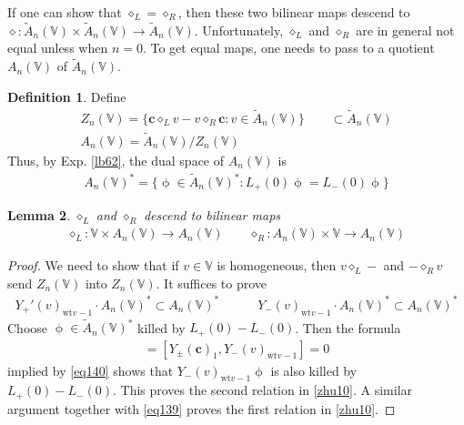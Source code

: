 \documentclass[11pt,b5paper,notitlepage]{article}
\theoremstyle{definition}
\newtheorem{df}{Definition}[subsection]
\theoremstyle{plain}
\newtheorem{lm}[df]{Lemma}
\newcommand{\wtd}{\widetilde}
\newcommand{\Vbb}{\mathbb V}
\newcommand{\cbf}{\mathbf c}
\newcommand{\wt}{\mathrm{wt}}
\newcommand{\<}{\left\langle}
\renewcommand{\>}{\right\rangle}
\numberwithin{equation}{subsection}
\begin{document}
If one can show that $\diamond_L=\diamond_R$, then these two bilinear maps descend to $\diamond:\wtd A_n(\Vbb)\times\wtd A_n(\Vbb)\rightarrow\wtd A_n(\Vbb)$. Unfortunately, $\diamond_L$ and $\diamond_R$ are in general not equal unless when $n=0$. To get equal maps, one needs to pass to a quotient $A_n(\Vbb)$ of $\wtd A_n(\Vbb)$.


\begin{df}
Define
\begin{subequations}\label{eq152}
\begin{gather}
Z_n(\Vbb)=\big\{\cbf\diamond_L v-v\diamond_R\cbf:v\in \wtd A_n(\Vbb)\big\}\qquad\subset \wtd A_n(\Vbb)\\[0.5ex]
A_n(\Vbb)=\wtd A_n(\Vbb)/Z_n(\Vbb)
\end{gather}
\end{subequations}
Thus, by Exp. \ref{lb62}, the dual space of $A_n(\Vbb)$ is
\begin{align}
A_n(\Vbb)^*=\big\{\upphi\in \wtd A_n(\Vbb)^*: L_+(0)\upphi= L_-(0)\upphi  \big\} \label{eq146}
\end{align}
\end{df}


\begin{lm}\label{zhu11}
$\diamond_L$ and $\diamond_R$ descend to bilinear maps
\begin{align}
\diamond_L:\Vbb\times A_n(\Vbb)\rightarrow A_n(\Vbb)\qquad \diamond_R: A_n(\Vbb)\times\Vbb\rightarrow A_n(\Vbb)   \label{eq143}
\end{align}
\end{lm}

     \begin{proof}
We need to show that if $v\in\Vbb$ is homogeneous, then $v\diamond_L-$ and $-\diamond_R v$ send $Z_n(\Vbb)$ into $Z_n(\Vbb)$. It suffices to prove
         \begin{align}\label{zhu10}
             Y_+'(v)_{\wt v-1}\cdot A_n(\Vbb)^*\subset A_n(\Vbb)^*\qquad\quad Y_-(v)_{\wt v-1}\cdot A_n(\Vbb)^*\subset A_n(\Vbb)^*
         \end{align}
Choose $\upphi\in\wtd A_n(\Vbb)^*$  killed by $L_+(0)-L_-(0)$. Then the formula
\begin{align*}
[L_\pm(0),Y_-(v)_{\wt v-1}]=[Y_\pm(\cbf)_1,Y_-(v)_{\wt v-1}]=0
\end{align*}
implied by \eqref{eq140} shows that $Y_-(v)_{\wt v-1}\upphi$ is also killed by $L_+(0)-L_-(0)$. This proves the second relation in \eqref{zhu10}. A similar argument together with \eqref{eq139} proves the first relation in \eqref{zhu10}.
     \end{proof}
\end{document}
